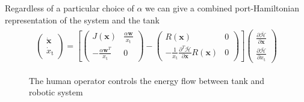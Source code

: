 \documentclass[a4paper,twoside, openright,12pt]{report}
\newcommand{\f}[1]{\boldsymbol{#1}}
\newcommand{\g}[1]{\text{#1}}
\begin{document}
{Regardless of a particular choice of $\alpha$ we can give a combined port-Hamiltonian representation of the  system and the tank
\begin{eqnarray}
\begin{aligned}
\begin{pmatrix}
\dot{\f{x}} \\ \dot{x}_\g{t}
\end{pmatrix} =
\left[
\begin{pmatrix}
J(\f{x}) & \frac{\alpha \f{w}}{x_\g{t}} \\ -\frac{\alpha \f{w}^T}{x_\g{t}} & 0
\end{pmatrix} - 
\begin{pmatrix}
R(\f{x}) & 0 \\ -\frac{1}{x_\g{t}}\frac{\partial^T \bar{\mathcal{H}}}{\partial \f{x}}R(\f{x}) & 0
\end{pmatrix}
\right]
\begin{pmatrix}
\frac{\partial \bar{\mathcal{H}}}{\partial \f{x}} \\
\frac{\partial \bar{\mathcal{H}}}{\partial x_\g{t}}
\end{pmatrix}
\end{aligned}
\end{eqnarray}

\begin{figure}[b!]
	\centering
	\small
	\def\svgwidth{0.95\columnwidth}
	
	\vspace{10pt}
	\caption{The human operator controls the energy flow between tank and robotic system}
	\label{FIG:energytank}
\end{figure} 

}
\end{document}
